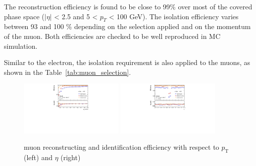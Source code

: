 The reconstruction efficiency is found to be close to 99\% over most of the covered phase space ($|\eta|$ < 2.5 and 5 < $p_{T}$ < 100 GeV). 
The isolation efficiency varies between 93 and 100 \% depending on the selection applied and on the momentum of the muon. 
Both efficiencies are checked to be well reproduced in MC simulation. 
\begin{table}[ht]
\centering
{}
 \caption{Summary of muon selection used in this analysis}
 \label{tab:muon_selection}
\end{table}
Similar to the electron, the isolation requirement is also applied to the muons, as shown in the Table~\ref{tab:muon_selection}.
\begin{figure}[tbp]
\begin{center}
 \includegraphics[width=0.45\textwidth,keepaspectratio]{figures/Reconstruction/recoMuonpT}
 \includegraphics[width=0.45\textwidth,keepaspectratio]{figures/Reconstruction/recoMuonEta}
\caption{
muon reconstructing and identification efficiency with respect to $p_\mathrm{T}$ (left) and $\eta$ (right) \cite{MUON-2018-03}
}
\label{fig:recoMuon}
\end{center}
\end{figure}
